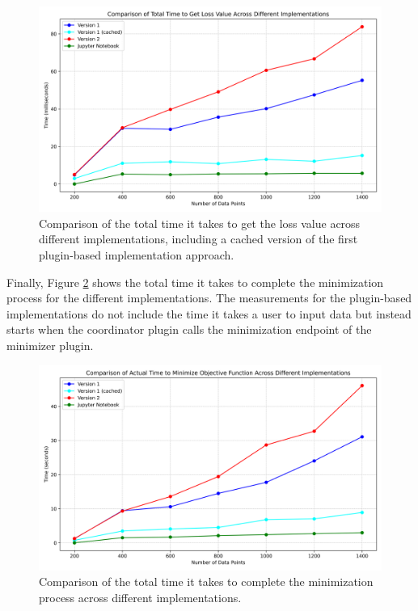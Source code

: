 \documentclass[
  a4paper,  %
  twoside,  %
  bibliography=totoc,
  headsepline,
  cleardoublepage=empty,
  parskip=half,
  draft=false
]{scrbook}
\begin{document}
\begin{figure}
  \centering
  \includegraphics[width=\textwidth]{graphics/comparison_of_of_cached.png}
  \caption{Comparison of the total time it takes to get the loss value across different implementations, including a cached version of the first plugin-based implementation approach.}
  \label{fig:coparison_of_of_cached}
\end{figure}

Finally, Figure \ref{fig:time_for_minimization} shows the total time it takes to complete the minimization process for the different implementations.
The measurements for the plugin-based implementations do not include the time it takes a user to input data but instead starts when the coordinator plugin calls the minimization endpoint of the minimizer plugin.

\begin{figure}
  \centering
  \includegraphics[width=\textwidth]{graphics/time_for_minimization.png}
  \caption{Comparison of the total time it takes to complete the minimization process across different implementations.}
  \label{fig:time_for_minimization}
\end{figure}
\end{document}
